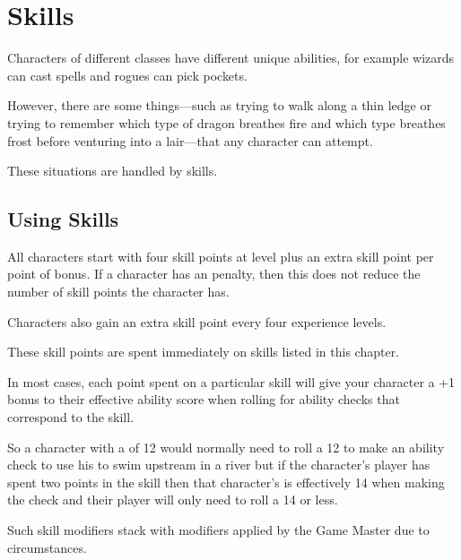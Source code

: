 \chapter[red]{Skills}
\label{chap:Skills}
\thispagestyle{plain}

\begin{multicols*}{2}
Characters of different classes have different unique abilities, for example wizards can cast spells and rogues can pick pockets.

However, there are some things—such as trying to walk along a thin ledge or trying to remember which type of dragon breathes fire and which type breathes frost before venturing into a lair—that any character can attempt.

These situations are handled by skills.

\section{Using Skills}
All characters start with four skill points at  level plus an extra skill point per point of  bonus. If a character has an  penalty, then this does not reduce the number of skill points the character has.

Characters also gain an extra skill point every four experience levels.

These skill points are spent immediately on skills listed in this chapter.

In most cases, each point spent on a particular skill will give your character a +1 bonus to their effective ability score when rolling for ability checks that correspond to the skill.

So a character with a  of 12 would normally need to roll a 12 to make an ability check to use his  to swim upstream in a river but if the character’s player has spent two points in the  skill then that character’s  is effectively 14 when making the check and their player will only need to roll a 14 or less.

Such skill modifiers stack with modifiers applied by the Game Master due to circumstances.

\end{multicols*}
